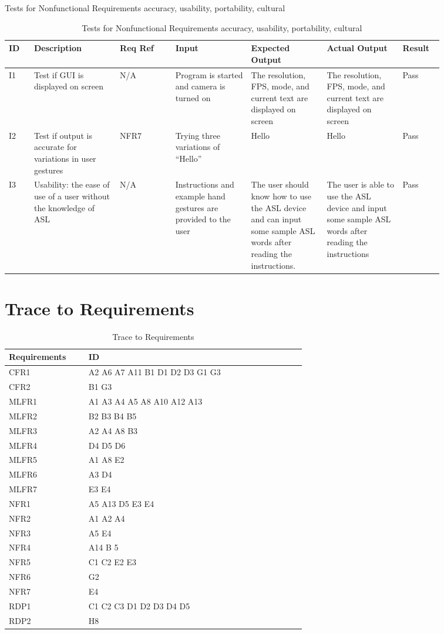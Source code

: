 \documentclass[12pt, titlepage]{article}
\begin{document}
\newpage
\centerline{Tests for Nonfunctional Requirements accuracy, usability, portability, cultural}

\renewcommand{\arraystretch}{1.2}
\noindent \begin{longtable}{p{0.05\linewidth}|p{0.17\linewidth}|p{0.11\linewidth}|p{0.15\linewidth}|p{0.15\linewidth}|p{0.15\linewidth}|p{0.08\linewidth}}
\hline
\textbf{ID} & \textbf{Description} & \textbf{Req Ref} & \textbf{Input} & \textbf{Expected Output} & \textbf{Actual Output} & \textbf{Result}\\
\hline
I1 & Test if GUI is displayed on screen & N/A & Program is started and camera is turned on & The resolution, FPS, mode, and current text are displayed on screen & The resolution, FPS, mode, and current text are displayed on screen & Pass\\ \hline
I2 & Test if output is accurate for variations in user gestures & NFR7 & Trying three variations of “Hello” & Hello & Hello & Pass\\ \hline
I3 & Usability: the ease of use of a user without the knowledge of ASL & N/A & Instructions and example hand gestures are provided to the user & The user should know how to use the ASL device and can input some sample ASL words after reading the instructions. & The user is able to use the ASL device and input some sample ASL words after reading the instructions & Pass
\hline
\caption{Tests for Nonfunctional Requirements accuracy, usability, portability, cultural}
\end{longtable}

\section{Trace to Requirements}

\renewcommand{\arraystretch}{1.2}
\noindent \begin{longtable}{p{0.22\linewidth}|p{0.6\linewidth}}
\hline
\textbf{Requirements} & \textbf{ID}\\
\hline
CFR1 & A2 A6 A7 A11 B1 D1 D2 D3 G1 G3\\ \hline
CFR2 & B1 G3\\ \hline
MLFR1 & A1 A3 A4 A5 A8 A10 A12 A13\\ \hline
MLFR2 & B2 B3 B4 B5\\ \hline
MLFR3 & A2 A4 A8 B3\\ \hline
MLFR4 & D4 D5 D6\\ \hline
MLFR5 & A1 A8 E2\\ \hline
MLFR6 & A3 D4\\ \hline
MLFR7 & E3 E4\\ \hline
NFR1 & A5 A13 D5 E3 E4\\ \hline
NFR2 & A1 A2 A4\\ \hline
NFR3 & A5 E4\\ \hline
NFR4 & A14 B 5\\ \hline
NFR5 & C1 C2 E2 E3\\ \hline
NFR6 & G2\\ \hline
NFR7 & E4\\ \hline
RDP1 & C1 C2 C3 D1 D2 D3 D4 D5\\ \hline
RDP2 & H8
\hline
\caption{Trace to Requirements}
\end{longtable}
		
\end{document}
